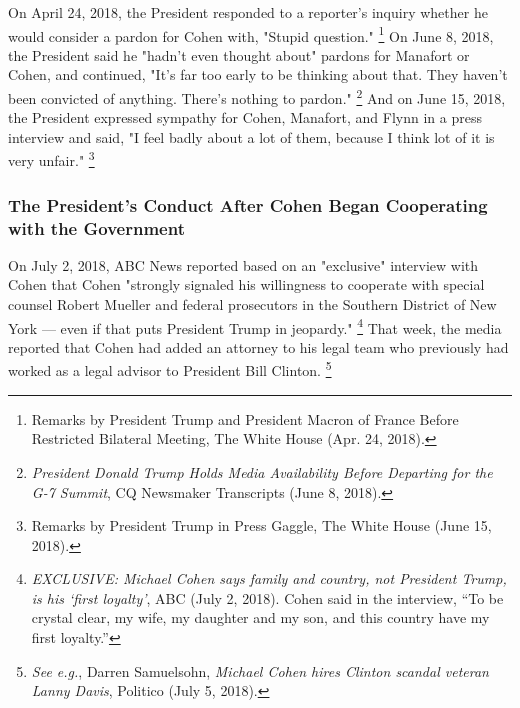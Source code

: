 {On April 24, 2018, the President responded to a reporter's inquiry whether he would consider a pardon for Cohen with, "Stupid question."%
\footnote{Remarks by President Trump and President Macron of France Before Restricted Bilateral Meeting, The White House (Apr. 24, 2018).}
On June 8, 2018, the President said he "hadn't even thought about" pardons for Manafort or Cohen, and continued, "It's far too early to be thinking about that.
They haven't been convicted of anything.
There's nothing to pardon."%
\footnote{\textit{President Donald Trump Holds Media Availability Before Departing for the G-7 Summit}, CQ Newsmaker Transcripts (June 8, 2018).}
And on June 15, 2018, the President expressed sympathy for Cohen, Manafort, and Flynn in a press interview and said, "I feel badly about a lot of them, because I think lot of it is very unfair."%
\footnote{Remarks by President Trump in Press Gaggle, The White House (June 15, 2018).}

\subsubsection{The President's Conduct After Cohen Began Cooperating with the Government}

On July 2, 2018, ABC News reported based on an "exclusive" interview with Cohen that Cohen "strongly signaled his willingness to cooperate with special counsel Robert Mueller and federal prosecutors in the Southern District of New York — even if that puts President Trump in jeopardy."%
\footnote{\textit{EXCLUSIVE: Michael Cohen says family and country, not President Trump, is his ‘first loyalty’}, ABC (July 2, 2018).
Cohen said in the interview, “To be crystal clear, my wife, my daughter and my son, and this country have my first loyalty.”}
That week, the media reported that Cohen had added an attorney to his legal team who previously had worked as a legal advisor to President Bill Clinton.%
\footnote{\textit{See e.g.}, Darren Samuelsohn, \textit{Michael Cohen hires Clinton scandal veteran Lanny Davis}, Politico (July 5, 2018).}

}
